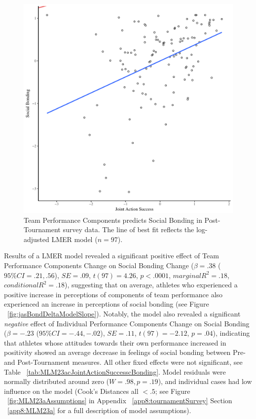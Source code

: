 \begin{CJK}{UTF8}{gbsn}
  \begin{figure}[htbp]
    \centering
  \includegraphics[scale=.5]{images/jasBondModelSlope.pdf}
    \caption{Team Performance Components predicts Social Bonding in Post-Tournament survey data. The line of best fit reflects the log-adjusted LMER model ($n = 97$).}
    \label{fig:jasBondModelSlope}
  \end{figure}




Results of a LMER model revealed a significant positive effect of  Team Performance Components Change on Social Bonding Change ($\beta = .38$ ($95\% CI =  .21, .56$), $SE = .09$, $t(97) = 4.26$, $p < .0001$, $marginal R^2 = .18$, $conditional R^2 = .18$), suggesting that on average, athletes who experienced a positive increase in perceptions of components of team performance also experienced an increase in perceptions of social bonding (see Figure ~\ref{fig:jasBondDeltaModelSlope}).  Notably, the model also revealed a significant \textit{negative} effect of Individual Performance Components Change on Social Bonding ($\beta = -.23$ ($95\% CI =  -.44, -.02$), $SE = .11$, $t(97) = -2.12$, $p = .04$), indicating that athletes whose attitudes towards their own performance increased in positivity showed an average decrease in feelings of social bonding between Pre- and Post-Tournament measures.
All other fixed effects were not significant, see Table ~\ref{tab:MLM23acJointActionSuccesscBonding}. Model residuals were normally distributed around zero ($W = .98, p = .19$), and individual cases had low influence on the model (Cook's Distances all $< .5$; see Figure ~\ref{fig:MLM23aAssumptions} in Appendix ~\ref{app8:tournamentSurvey} Section ~\ref{app8:MLM23a} for a full description of model assumptions).


\end{CJK}
